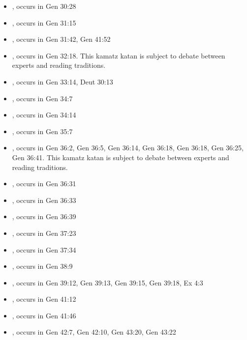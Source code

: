 \documentclass[14pt]{article}
\begin{document}
\begin{itemize}
\item {}, occurs in Gen 30:28

\item {}, occurs in Gen 31:15

\item {}, occurs in Gen 31:42, Gen 41:52

\item {}, occurs in Gen 32:18. This kamatz katan is subject to debate between experts and reading traditions.

\item {}, occurs in Gen 33:14, Deut 30:13

\item {}, occurs in Gen 34:7

\item {}, occurs in Gen 34:14

\item {}, occurs in Gen 35:7

\item {}, occurs in Gen 36:2, Gen 36:5, Gen 36:14, Gen 36:18, Gen 36:18, Gen 36:25, Gen 36:41. This kamatz katan is subject to debate between experts and reading traditions.


\item {}, occurs in Gen 36:31

\item {}, occurs in Gen 36:33

\item {}, occurs in Gen 36:39

\item {}, occurs in Gen 37:23

\item {}, occurs in Gen 37:34

\item {}, occurs in Gen 38:9

\item {}, occurs in Gen 39:12, Gen 39:13, Gen 39:15, Gen 39:18, Ex 4:3

\item {}, occurs in Gen 41:12

\item {}, occurs in Gen 41:46

\item {}, occurs in Gen 42:7, Gen 42:10, Gen 43:20, Gen 43:22


\end{itemize}
\end{document}
